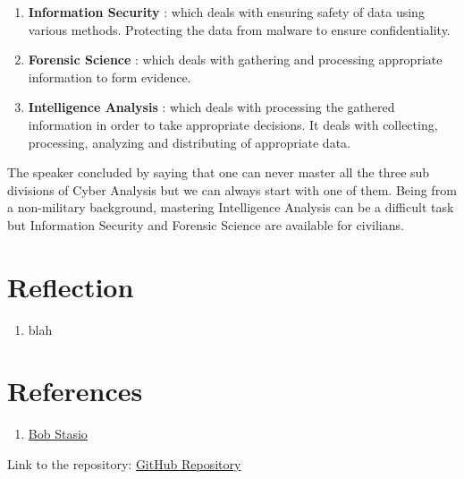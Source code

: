 \documentclass{article}
\begin{document}
\begin{enumerate}
\item \textbf{ Information Security} : which deals with ensuring safety of data using various methods. Protecting the data from malware  to ensure confidentiality.
\item \textbf{ Forensic Science} : which deals with gathering and processing appropriate information to form evidence.
\item \textbf{ Intelligence Analysis} :  which deals with processing the gathered information in order to take appropriate decisions. It deals with collecting, processing, analyzing and distributing of appropriate data. \\
\end{enumerate}

The speaker concluded by saying that one can never master all the three sub divisions of Cyber Analysis but we can always start with one of them. Being from a non-military background, mastering Intelligence Analysis can be a difficult task but Information Security and Forensic Science are available for civilians. 

\section*{Reflection}


\begin{enumerate}

\item blah
\end{enumerate}



 
\section*{References}

\begin{enumerate}
\item  \href{http://www.fierceitsecurity.com/tags/cyber-analysis}{Bob Stasio}
\end{enumerate}


Link to the repository:  \href{https://github.com/rsaranya/SecurityAlgorithm.git}{GitHub Repository}
\end{document}

